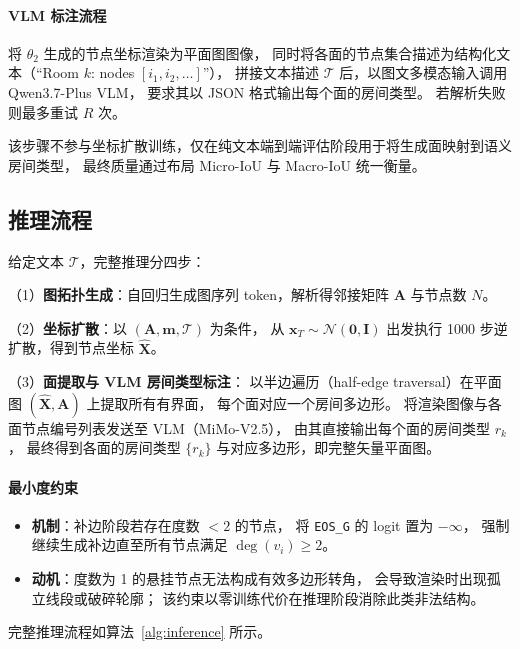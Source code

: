 \paragraph{VLM 标注流程}
将 $\theta_2$ 生成的节点坐标渲染为平面图图像，
同时将各面的节点集合描述为结构化文本（``Room $k$: nodes $[i_1, i_2, \ldots]$''），
拼接文本描述 $\mathcal{T}$ 后，以图文多模态输入调用 Qwen3.7-Plus VLM，
要求其以 JSON 格式输出每个面的房间类型。
若解析失败则最多重试 $R$ 次。

该步骤不参与坐标扩散训练，仅在纯文本端到端评估阶段用于将生成面映射到语义房间类型，
最终质量通过布局 Micro-IoU 与 Macro-IoU 统一衡量。

\subsection{推理流程}
\label{subsec:inference}

给定文本 $\mathcal{T}$，完整推理分四步：

\noindent
（1）\textbf{图拓扑生成}：自回归生成图序列 token，解析得邻接矩阵 $\mathbf{A}$ 与节点数 $N$。

\noindent
（2）\textbf{坐标扩散}：以 $(\mathbf{A}, \mathbf{m}, \mathcal{T})$ 为条件，
从 $\mathbf{x}_T \sim \mathcal{N}(\mathbf{0},\mathbf{I})$
出发执行 1000 步逆扩散，得到节点坐标 $\hat{\mathbf{X}}$。

\noindent
（3）\textbf{面提取与 VLM 房间类型标注}：
以半边遍历（half-edge traversal）在平面图 $(\hat{\mathbf{X}}, \mathbf{A})$ 上提取所有有界面，
每个面对应一个房间多边形。
将渲染图像与各面节点编号列表发送至 VLM（MiMo-V2.5），
由其直接输出每个面的房间类型 $r_k$，
最终得到各面的房间类型 $\{r_k\}$ 与对应多边形，即完整矢量平面图。
\paragraph{最小度约束}
\begin{itemize}
    \item \textbf{机制}：补边阶段若存在度数 $< 2$ 的节点，
          将 \texttt{EOS\_G} 的 logit 置为 $-\infty$，
          强制继续生成补边直至所有节点满足 $\deg(v_i) \geq 2$。
    \item \textbf{动机}：度数为 1 的悬挂节点无法构成有效多边形转角，
          会导致渲染时出现孤立线段或破碎轮廓；
          该约束以零训练代价在推理阶段消除此类非法结构。
\end{itemize}

完整推理流程如算法~\ref{alg:inference} 所示。

